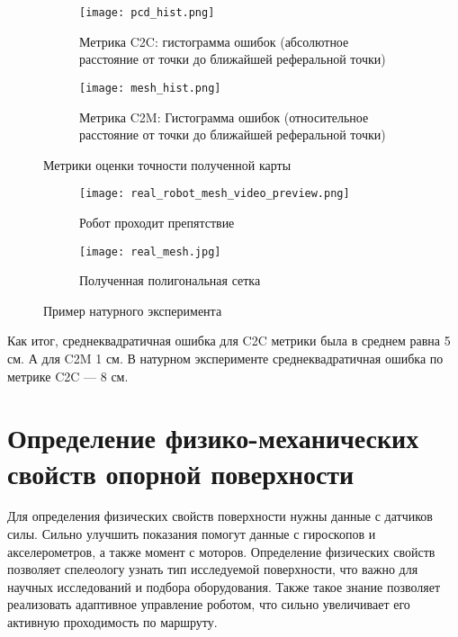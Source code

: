 \begin{figure}[H]
    \begin{subfigure}[t]{0.99\textwidth}
        \centering\texttt{[image: pcd\_hist.png]}
        \caption{Метрика C2C: гистограмма ошибок (абсолютное расстояние от точки до ближайшей реферальной точки)}
        \label{fig:metric_c2c}
    \end{subfigure}

    \begin{subfigure}[t]{0.99\textwidth}
        \centering\texttt{[image: mesh\_hist.png]}
        \caption{Метрика C2M: Гистограмма ошибок (относительное расстояние от точки до ближайшей реферальной точки)}
        \label{fig:metric_c2m}
    \end{subfigure}
    \caption{Метрики оценки точности полученной карты}
    \label{fig:metrics}
\end{figure}


\begin{figure}[H]
    \begin{subfigure}[t]{0.99\textwidth}
        \centering\texttt{[image: real\_robot\_mesh\_video\_preview.png]}
        \caption{Робот проходит препятствие}
        \label{fig:real_robot_mesh_video_preview.png}
    \end{subfigure}

    \begin{subfigure}[t]{0.99\textwidth}
        \centering\texttt{[image: real\_mesh.jpg]}
        \caption{Полученная полигональная сетка}
        \label{fig:real_mesh.jpg}
    \end{subfigure}
    \caption{Пример натурного эксперимента}
    \label{fig:real_exp_map_creation}
\end{figure}

Как итог, среднеквадратичная ошибка для C2C метрики была в среднем равна 5 см. А для C2M 1 см. В натурном эксперименте среднеквадратичная ошибка по метрике C2C --- 8 см.

\section{Определение физико-механических свойств опорной поверхности}
Для определения физических свойств поверхности нужны данные с датчиков силы. Сильно улучшить показания помогут данные с гироскопов и акселерометров, а также момент с моторов. Определение физических свойств позволяет спелеологу узнать тип исследуемой поверхности, что важно для научных исследований и подбора оборудования. Также такое знание позволяет реализовать адаптивное управление роботом, что сильно увеличивает его активную проходимость по маршруту.

